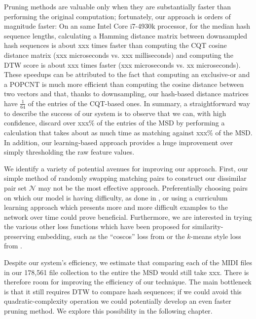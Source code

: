 Pruning methods are valuable only when they are substantially faster than performing the original computation; fortunately, our approach is orders of magnitude faster:
On an same Intel Core i7-4930k processor, for the median hash sequence lengths, calculating a Hamming distance matrix between downsampled hash sequences is about xxx times faster than computing the CQT cosine distance matrix (xxx microseconds vs. xxx milliseconds) and computing the DTW score is about xxx times faster (xxx microseconds vs. xx microseconds).
These speedups can be attributed to the fact that computing an exclusive-or and a POPCNT is much more efficient than computing the cosine distance between two vectors and that, thanks to downsampling, our hash-based distance matrices have $\frac{1}{64}$ of the entries of the CQT-based ones.
In summary, a straightforward way to describe the success of our system is to observe that we can, with high confidence, discard over xxx\% of the entries of the MSD by performing a calculation that takes about as much time as matching against xxx\% of the MSD.
In addition, our learning-based approach provides a huge improvement over simply thresholding the raw feature values.

We identify a variety of potential avenues for improving our approach.
First, our simple method of randomly swapping matching pairs to construct our dissimilar pair set $\mathcal{N}$ may not be the most effective approach.
Preferentially choosing pairs on which our model is having difficulty, as done in \cite{schroff2015facenet}, or using a curriculum learning approach which presents more and more difficult examples to the network over time \cite{bengio2009curriculum} could prove beneficial.
Furthermore, we are interested in trying the various other loss functions which have been proposed for similarity-preserving embedding, such as the ``coscos'' loss from \cite{kamper2016deep} or the $k$-means style loss from \cite{hershey2016deep}.

Despite our system's efficiency, we estimate that comparing each of the MIDI files in our 178,561 file collection to the entire the MSD would still take xxx.
There is therefore room for improving the efficiency of our technique.
The main bottleneck is that it still requires DTW to compare hash sequences; if we could avoid this quadratic-complexity operation we could potentially develop an even faster pruning method.
We explore this possibility in the following chapter.
